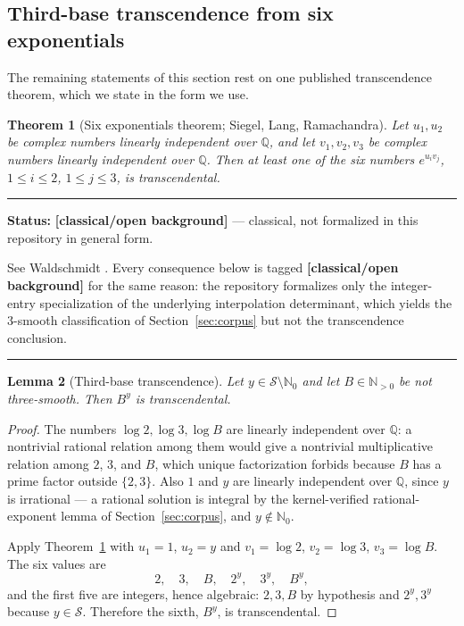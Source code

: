\documentclass[11pt,oneside]{article}
\newtheorem{theorem}{Theorem}[section]
\newtheorem{lemma}[theorem]{Lemma}
\theoremstyle{definition}
\theoremstyle{remark}
\newcommand{\N}{\mathbb N}
\newcommand{\Nzero}{\mathbb N_0}
\newcommand{\Q}{\mathbb Q}
\newcommand{\Sol}{\mathcal S}
\newcommand{\statusknown}{\textcolor{classicalgray}{\textbf{[classical/\allowbreak open background]}}}
\newenvironment{statusbox}[1]
{\begin{center}\begin{minipage}{0.94\textwidth}\raggedright\hbadness=10000\hrule
\vspace{0.45em}\textbf{Status:} #1\par\vspace{0.35em}}
{\vspace{0.35em}\hrule\end{minipage}\end{center}}
\begin{document}
\subsection{Third-base transcendence from six exponentials}

The remaining statements of this section rest on one published transcendence theorem, which
we state in the form we use.

\begin{theorem}[Six exponentials theorem; Siegel, Lang, Ramachandra]
\label{sm:six-exp}
Let $u_1,u_2$ be complex numbers linearly independent over $\Q$, and let $v_1,v_2,v_3$ be
complex numbers linearly independent over $\Q$.  Then at least one of the six numbers
$e^{u_iv_j}$, $1\le i\le2$, $1\le j\le3$, is transcendental.
\end{theorem}

\begin{statusbox}{\statusknown{} --- classical, not formalized in this repository in general
form.}
See Waldschmidt \cite{Waldschmidt2000,Waldschmidt2005}.  Every consequence below is tagged
\statusknown{} for the same reason: the repository formalizes only the integer-entry
specialization of the underlying interpolation determinant, which yields the $3$-smooth
classification of Section~\ref{sec:corpus} but not the transcendence conclusion.
\end{statusbox}

\begin{lemma}[Third-base transcendence]
\label{sm:third-base-trans}
Let $y\in\Sol\setminus\Nzero$ and let $B\in\N_{>0}$ be not three-smooth.  Then $B^y$ is
transcendental.
\end{lemma}

\begin{proof}
The numbers $\log2,\log3,\log B$ are linearly independent over $\Q$: a nontrivial rational
relation among them would give a nontrivial multiplicative relation among $2$, $3$, and $B$,
which unique factorization forbids because $B$ has a prime factor outside $\{2,3\}$.  Also
$1$ and $y$ are linearly independent over $\Q$, since $y$ is irrational --- a rational
solution is integral by the kernel-verified rational-exponent lemma of
Section~\ref{sec:corpus}, and $y\notin\Nzero$.

Apply Theorem~\ref{sm:six-exp} with $u_1=1$, $u_2=y$ and $v_1=\log2$, $v_2=\log3$,
$v_3=\log B$.  The six values are
\[
 2,\quad 3,\quad B,\quad 2^y,\quad 3^y,\quad B^y,
\]
and the first five are integers, hence algebraic: $2,3,B$ by hypothesis and $2^y,3^y$
because $y\in\Sol$.  Therefore the sixth, $B^y$, is transcendental.
\end{proof}
\end{document}
